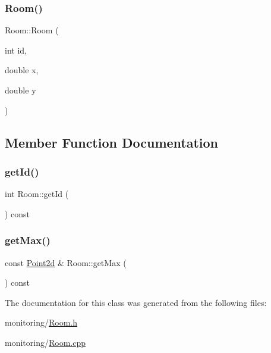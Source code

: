 \subsubsection{\texorpdfstring{Room()}{Room()}\hspace{0.1cm}{\footnotesize\ttfamily [2/2]}}
{\footnotesize\ttfamily Room\+::\+Room (\begin{DoxyParamCaption}\item[{int}]{id,  }\item[{double}]{x,  }\item[{double}]{y }\end{DoxyParamCaption})\hspace{0.3cm}{\ttfamily [inline]}}



\subsection{Member Function Documentation}
\mbox{\label{class_room_a416c1fe7e1338a64c2781becf17e85dd}} 
\subsubsection{\texorpdfstring{get\+Id()}{getId()}}
{\footnotesize\ttfamily int Room\+::get\+Id (\begin{DoxyParamCaption}{ }\end{DoxyParamCaption}) const}

\mbox{\label{class_room_ad53da98167994fc819724187bc837096}} 
\subsubsection{\texorpdfstring{get\+Max()}{getMax()}}
{\footnotesize\ttfamily const \hyperlink{class_point2d}{Point2d} \& Room\+::get\+Max (\begin{DoxyParamCaption}{ }\end{DoxyParamCaption}) const}



The documentation for this class was generated from the following files\+:\begin{DoxyCompactItemize}
\item 
monitoring/\hyperlink{_room_8h}{Room.\+h}\item 
monitoring/\hyperlink{_room_8cpp}{Room.\+cpp}\end{DoxyCompactItemize}
